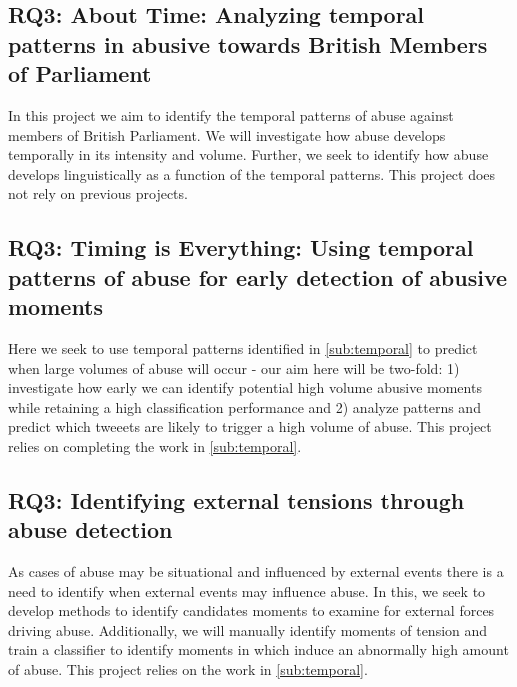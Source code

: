 \subsection{RQ3: About Time: Analyzing temporal patterns in abusive towards British Members of Parliament}\label{sub:temporal}
In this project we aim to identify the temporal patterns of abuse against members of British Parliament. We will investigate how abuse develops temporally in its intensity and volume. Further, we seek to identify how abuse develops linguistically as a function of the temporal patterns. This project does not rely on previous projects.

\subsection{RQ3: Timing is Everything: Using temporal patterns of abuse for early detection of abusive moments}\label{sub:timing}
Here we seek to use temporal patterns identified in \autoref{sub:temporal} to predict when large volumes of abuse will occur - our aim here will be two-fold: 1) investigate how early we can identify potential high volume abusive moments while retaining a high classification performance and 2) analyze patterns and predict which tweeets are likely to trigger a high volume of abuse. This project relies on completing the work in \autoref{sub:temporal}.

\subsection{RQ3: Identifying external tensions through abuse detection}\label{sub:external}
As cases of abuse may be situational and influenced by external events \citep{Marsh:2018,Burret:2017,Dearden:2019} there is a need to identify when external events may influence abuse. In this, we seek to develop methods to identify candidates moments to examine for external forces driving abuse. Additionally, we will manually identify moments of tension and train a classifier to identify moments in which induce an abnormally high amount of abuse. This project relies on the work in \autoref{sub:temporal}.

